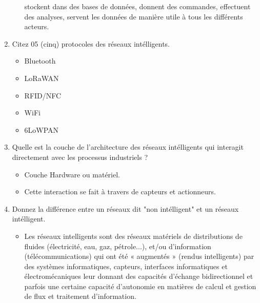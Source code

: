 \begin{enumerate}
\begin{itemize}
                        stockent dans des bases de données, donnent des commandes, effectuent
                        des analyses, servent les données de manière utile à tous les différents
                        acteurs.
            \end{itemize}
      \item Citez 05 (cinq) protocoles des réseaux intélligents.
            \begin{itemize}
                  \item Bluetooth
                  \item LoRaWAN
                  \item RFID/NFC
                  \item WiFi
                  \item 6LoWPAN
            \end{itemize}
      \item Quelle est la couche de l'architecture des réseaux intélligents qui interagit directement avec les processus industriels ?
            \begin{itemize}
                  \item Couche Hardware ou matériel.
                  \item Cette interaction se fait à travers de capteurs et actionneurs.
            \end{itemize}
      \item Donnez la différence entre un réseaux dit "non intélligent" et un réseaux intélligent.
            \begin{itemize}
                  \item{Les réseaux intelligents sont des réseaux matériels de distributions de fluides (électricité, eau, gaz, pétrole...), et/ou d'information (télécommunications) qui ont été « augmentés » (rendus intelligents) par des systèmes informatiques, capteurs, interfaces informatiques et électromécaniques leur donnant des capacités d'échange bidirectionnel et parfois une certaine capacité d'autonomie en matières de calcul et gestion de flux et traitement d'information.}
            \end{itemize}
\end{enumerate}